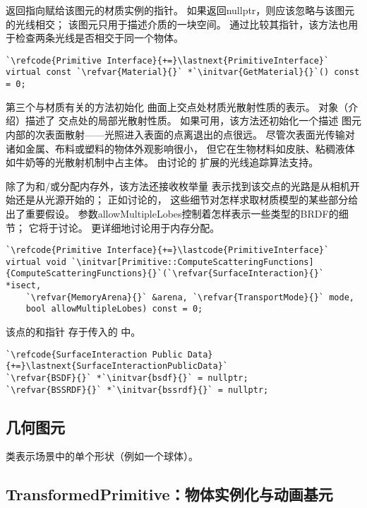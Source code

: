 返回指向赋给该图元的材质实例的指针。
如果返回{\ttfamily nullptr}，则应该忽略与该图元的光线相交；
该图元只用于描述介质的一块空间。
通过比较其指针，该方法也用于检查两条光线是否相交于同一个物体。
\begin{lstlisting}
`\refcode{Primitive Interface}{+=}\lastnext{PrimitiveInterface}`
virtual const `\refvar{Material}{}` *`\initvar{GetMaterial}{}`() const = 0;
\end{lstlisting}

第三个与材质有关的方法初始化
曲面上交点处材质光散射性质的表示。
对象（介绍）描述了
交点处的局部光散射性质。
如果可用，该方法还初始化一个描述
图元内部的次表面散射——光照进入表面的点离退出的点很远。
尽管次表面光传输对诸如金属、布料或塑料的物体外观影响很小，
但它在生物材料如皮肤、粘稠液体如牛奶等的光散射机制中占主体。
由讨论的
扩展的光线追踪算法支持。

除了为和/或分配内存外，该方法还接收枚举量\linebreak
{}表示找到该交点的光路是从相机开始还是从光源开始的；
正如讨论的，
这些细节对怎样求取材质模型的某些部分给出了重要假设。
参数{\ttfamily allowMultipleLobes}控制着怎样表示一些类型的BRDF的细节；
它将于讨论。
更详细地讨论用于内存分配。
\begin{lstlisting}
`\refcode{Primitive Interface}{+=}\lastcode{PrimitiveInterface}`
virtual void `\initvar[Primitive::ComputeScatteringFunctions]{ComputeScatteringFunctions}{}`(`\refvar{SurfaceInteraction}{}` *isect,
    `\refvar{MemoryArena}{}` &arena, `\refvar{TransportMode}{}` mode,
    bool allowMultipleLobes) const = 0;
\end{lstlisting}

该点的和指针
存于传入的\linebreak
{}中。
\begin{lstlisting}
`\refcode{SurfaceInteraction Public Data}{+=}\lastnext{SurfaceInteractionPublicData}`
`\refvar{BSDF}{}` *`\initvar{bsdf}{}` = nullptr;
`\refvar{BSSRDF}{}` *`\initvar{bssrdf}{}` = nullptr;
\end{lstlisting}

\subsection{几何图元}\label{sub:几何图元}
类表示场景中的单个形状（例如一个球体）。


\subsection{TransformedPrimitive：物体实例化与动画基元}\label{sub:TransformedPrimitive：物体实例化与动画基元}